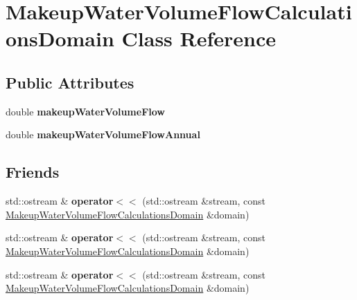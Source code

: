 \hypertarget{class_makeup_water_volume_flow_calculations_domain}{}\section{Makeup\+Water\+Volume\+Flow\+Calculations\+Domain Class Reference}
\label{class_makeup_water_volume_flow_calculations_domain}
\subsection*{Public Attributes}
\begin{DoxyCompactItemize}
\item 
\mbox{\label{class_makeup_water_volume_flow_calculations_domain_aed6b9213ca0ff90cd6f251512174fa7c}} 
double {\bfseries makeup\+Water\+Volume\+Flow}
\item 
\mbox{\label{class_makeup_water_volume_flow_calculations_domain_aa3767f09a260f0a930133d5001eea93c}} 
double {\bfseries makeup\+Water\+Volume\+Flow\+Annual}
\end{DoxyCompactItemize}
\subsection*{Friends}
\begin{DoxyCompactItemize}
\item 
\mbox{\label{class_makeup_water_volume_flow_calculations_domain_a502122ab33a1a451cc8a41d5a9aaae2e}} 
std\+::ostream \& {\bfseries operator$<$$<$} (std\+::ostream \&stream, const \hyperlink{class_makeup_water_volume_flow_calculations_domain}{Makeup\+Water\+Volume\+Flow\+Calculations\+Domain} \&domain)
\item 
\mbox{\label{class_makeup_water_volume_flow_calculations_domain_a502122ab33a1a451cc8a41d5a9aaae2e}} 
std\+::ostream \& {\bfseries operator$<$$<$} (std\+::ostream \&stream, const \hyperlink{class_makeup_water_volume_flow_calculations_domain}{Makeup\+Water\+Volume\+Flow\+Calculations\+Domain} \&domain)
\item 
\mbox{\label{class_makeup_water_volume_flow_calculations_domain_a502122ab33a1a451cc8a41d5a9aaae2e}} 
std\+::ostream \& {\bfseries operator$<$$<$} (std\+::ostream \&stream, const \hyperlink{class_makeup_water_volume_flow_calculations_domain}{Makeup\+Water\+Volume\+Flow\+Calculations\+Domain} \&domain)
\end{DoxyCompactItemize}


